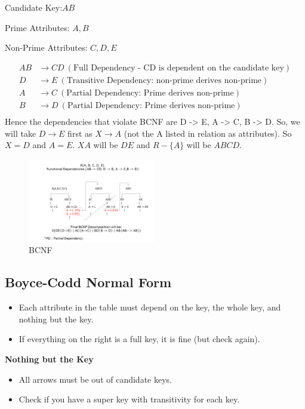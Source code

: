 \documentclass{article}
\begin{document}
Candidate Key:$ AB$

Prime Attributes: $A, B$

Non-Prime Attributes: $C, D, E$

\begin{align*}
    AB &\rightarrow CD \ (\text{Full Dependency - CD is dependent on the candidate key}) \\
    D &\rightarrow E \ (\text{Transitive Dependency: non-prime derives non-prime}) \\
    A &\rightarrow C \ (\text{Partial Dependency: Prime derives non-prime}) \\
    B &\rightarrow D \ (\text{Partial Dependency: Prime derives non-prime}) \\
\end{align*}
Hence the dependencies that violate BCNF are D -> E, A -> C, B -> D.
So, we will take $D \rightarrow E$ first as $X \rightarrow A$ (not the A listed in relation as attributes). So $X = D$ and $A = E$. $XA$ will be $DE$ and $R - \{A\}$ will be $ABCD$.
\begin{figure}[h]
    \centering
    \includegraphics[width=0.5\textwidth]{assets/BCNF.png}
    \caption{BCNF}
\end{figure}

\subsection{Boyce-Codd Normal Form}
\begin{itemize}
    \item Each attribute in the table must depend on the key, the whole key, and nothing
          but the key.
    \item If everything on the right is a full key, it is fine (but check again).
\end{itemize}
\textbf{Nothing but the Key}
\begin{itemize}
    \item All arrows must be out of candidate keys.
    \item Check if you have a super key with transitivity for each key.
\end{itemize}
\end{document}
